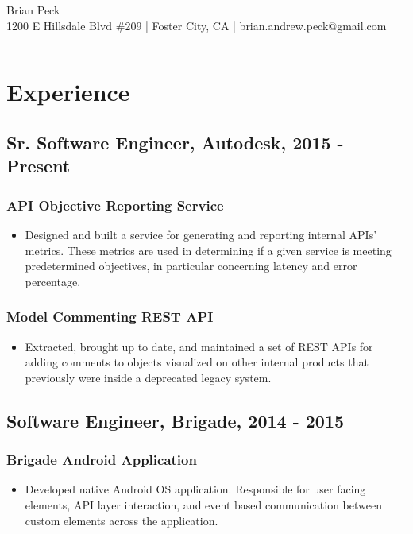 \documentclass[11pt]{article}
\title{}
\date{}
\begin{document}
\begin{center}
{\huge Brian Peck} \\
1200 E Hillsdale Blvd \#209 | Foster City, CA | brian.andrew.peck@gmail.com
\hrule
\end{center}

\section*{Experience}
\label{sec-1}
\subsection*{Sr. Software Engineer, Autodesk, 2015 - Present}
\label{sec-1-1}
\subsubsection*{API Objective Reporting Service}
\label{sec-1-1-1}

\begin{itemize}
\item Designed and built a service for generating and reporting internal APIs' metrics. These metrics are used in determining if a given service is meeting predetermined objectives, in particular concerning latency and error percentage.
\end{itemize}
\subsubsection*{Model Commenting REST API}
\label{sec-1-1-2}

\begin{itemize}
\item Extracted, brought up to date, and maintained a set of REST APIs for adding comments to objects visualized on other internal products that previously were inside a deprecated legacy system.
\end{itemize}
\subsection*{Software Engineer, Brigade, 2014 - 2015}
\label{sec-1-2}
\subsubsection*{Brigade Android Application}
\label{sec-1-2-1}

\begin{itemize}
\item Developed native Android OS application. Responsible for user facing elements, API layer interaction, and event based communication between custom elements across the application.
\end{itemize}
\end{document}

